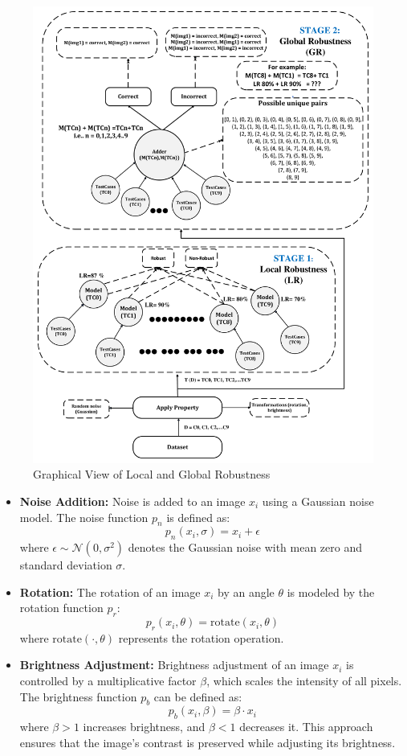 \documentclass[10pt, conference, a4paper, final]{IEEEtran}
\begin{document}
\begin{figure}{}
    \centering
    \includegraphics[width=\linewidth]{paper_images/MNIST Adder.pdf}
    \caption{Graphical View of Local and Global Robustness}
    \label{fig:graph}
\end{figure}

\begin{itemize}
    \item \textbf{Noise Addition:} Noise is added to an image \( x_i \) using a Gaussian noise model. The noise function \( p_n \) is defined as:
    \[ p_n(x_i, \sigma) = x_i + \epsilon \]
    where \( \epsilon \sim \mathcal{N}(0, \sigma^2) \) denotes the Gaussian noise with mean zero and standard deviation \(\sigma\).

    \item \textbf{Rotation:} The rotation of an image \( x_i \) by an angle \(\theta\) is modeled by the rotation function \( p_r \):
    \[ p_r(x_i, \theta) = \text{rotate}(x_i, \theta) \]
    where \(\text{rotate}(\cdot, \theta)\) represents the rotation operation.

    \item \textbf{Brightness Adjustment:} Brightness adjustment of an image \( x_i \) is controlled by a multiplicative factor \( \beta \), which scales the intensity of all pixels. The brightness function \( p_b \) can be defined as:
    \[ p_b(x_i, \beta) = \beta \cdot x_i \]
    where \( \beta > 1 \) increases brightness, and \( \beta < 1 \) decreases it. This approach ensures that the image's contrast is preserved while adjusting its brightness.

\end{itemize}
\end{document}
